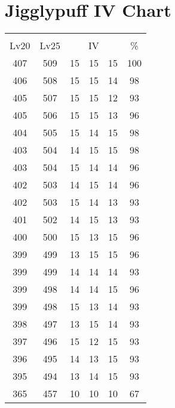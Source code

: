 \documentclass{article}%
\begin{document}
%
\normalsize%
\section{Jigglypuff IV Chart}%
\label{sec:Jigglypuff IV Chart}%
\renewcommand{\arraystretch}{1.5}%
\begin{tabular}{|c|c|c|c|c|c|}%
\hline%
\multicolumn{6}{|c|}{\textcolor{white}{ 
\linebreak{Jigglypuff}
}%
\cellcolor{black}}\\%
\multicolumn{1}{|c}{Lv20}&\multicolumn{1}{c|}{Lv25}&\multicolumn{3}{c|}{IV}&\multicolumn{1}{|c|}{\%}\\%
\hline%
\rowcolor{color100}%
407&509&15&15&15&100\\%
\hline%
\rowcolor{color98}%
406&508&15&15&14&98\\%
\hline%
\rowcolor{color93}%
405&507&15&15&12&93\\%
\hline%
\rowcolor{color96}%
405&506&15&15&13&96\\%
\hline%
\rowcolor{color98}%
404&505&15&14&15&98\\%
\hline%
\rowcolor{color98}%
403&504&14&15&15&98\\%
\hline%
\rowcolor{color96}%
403&504&15&14&14&96\\%
\hline%
\rowcolor{color96}%
402&503&14&15&14&96\\%
\hline%
\rowcolor{color93}%
402&503&15&14&13&93\\%
\hline%
\rowcolor{color93}%
401&502&14&15&13&93\\%
\hline%
\rowcolor{color96}%
400&500&15&13&15&96\\%
\hline%
\rowcolor{color96}%
399&499&13&15&15&96\\%
\hline%
\rowcolor{color93}%
399&499&14&14&14&93\\%
\hline%
\rowcolor{color96}%
399&498&14&14&15&96\\%
\hline%
\rowcolor{color93}%
399&498&15&13&14&93\\%
\hline%
\rowcolor{color93}%
398&497&13&15&14&93\\%
\hline%
\rowcolor{color93}%
397&496&15&12&15&93\\%
\hline%
\rowcolor{color93}%
396&495&14&13&15&93\\%
\hline%
\rowcolor{color93}%
395&494&13&14&15&93\\%
\hline%
\rowcolor{color91}%
365&457&10&10&10&67\\%
\end{tabular}

%
\end{document}
